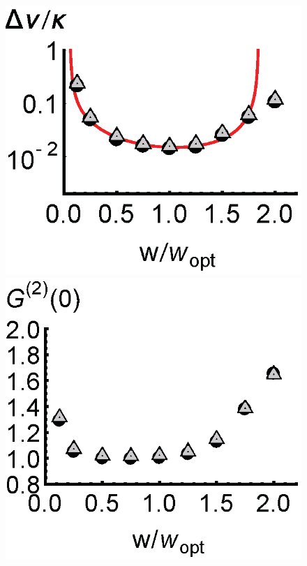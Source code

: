 \documentclass[aps,
twocolumn,
showpacs,
superscriptaddress,groupedaddress]{revtex4}
\begin{document}
\begin{figure}
\begin{center}
	\hspace{-5.0mm} \includegraphics[scale =0.38] {N40CrossoverLW.eps}
	\hspace{-5.0mm} \includegraphics[scale =0.38] {N40CrossoverG2.eps}\\ \vspace{0mm}

\end{center}
\end{figure}
\end{document}
